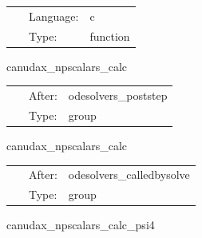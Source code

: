 \hspace{5mm}

 \begin{tabular*}{160mm}{cll} 
~ & Language:  & c \\ 
~ & Type:  & function \\ 
\end{tabular*} 


\vspace{5mm}


\hspace{5mm} canudax\_npscalars\_calc 

\hspace{5mm}{\it calculate newman-penrose scalars } 


\hspace{5mm}

 \begin{tabular*}{160mm}{cll} 
~ & After:  & odesolvers\_poststep \\ 
~ & Type:  & group \\ 
\end{tabular*} 


\vspace{5mm}


\hspace{5mm} canudax\_npscalars\_calc 

\hspace{5mm}{\it calculate newman-penrose scalars } 


\hspace{5mm}

 \begin{tabular*}{160mm}{cll} 
~ & After:  & odesolvers\_calledbysolve \\ 
~ & Type:  & group \\ 
\end{tabular*} 


\vspace{5mm}


\hspace{5mm} canudax\_npscalars\_calc\_psi4 

\hspace{5mm}{\it calculate newman-penrose scalar psi4 as a grid function } 


\hspace{5mm}

